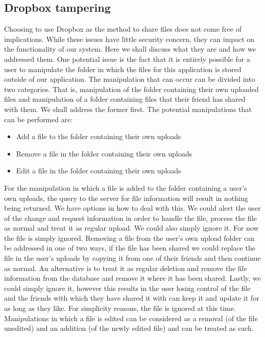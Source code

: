\documentclass[12pt, titlepage]{article}
\begin{document}
\subsection{Dropbox tampering}
Choosing to use Dropbox as the method to share files does not come free of implications. While these issues have little security concern, they can impact on the functionality of our system. Here we shall discuss what they are and how we addressed them.
\newline \indent One potential issue is the fact that it is entirely possible for a user to manipulate the folder in which the files for this application is stored outside of our application. The manipulation that can occur can be divided into two categories. That is, manipulation of the folder containing their own uploaded files and manipulation of a folder containing files that their friend has shared with them. We shall address the former first. The potential manipulations that can be performed are:
\begin{itemize}
	\item Add a file to the folder containing their own uploads
	\item Remove a file in the folder containing their own uploads
	\item Edit a file in the folder containing their own uploads
\end{itemize}
For the manipulation in which a file is added to the folder containing a user's own uploads, the query to the server for file information will result in nothing being returned. We have options in how to deal with this. We could alert the user of the change and request information in order to handle the file, process the file as normal and treat it as regular upload. We could also simply ignore it. For now the file is simply ignored.
\newline \indent Removing a file from the user's own upload folder can be addressed in one of two ways, if the file has been shared we could replace the file in the user's uploads by copying it from one of their friends and then continue as normal. An alternative is to treat it as regular deletion and remove the file information from the database and remove it where it has been shared. Lastly, we could simply ignore it, however this results in the user losing control of the file and the friends with which they have shared it with can keep it and update it for as long as they like. For simplicity reasons, the file is ignored at this time.
\newline \indent Manipulations in which a file is edited can be considered as a removal (of the file unedited) and an addition (of the newly edited file) and can be treated as such.
\end{document}
